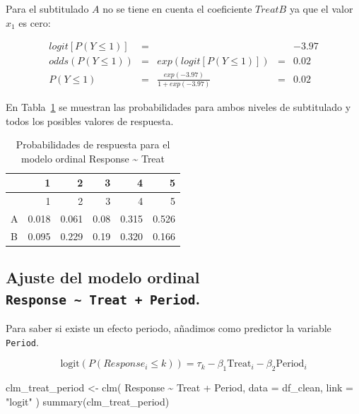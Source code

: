\documentclass[
  12pt,
  a4paper,
  extrafontsizes,
  onecolumn,
  openright]{memoir}
\newenvironment{Shaded}{\begin{snugshade}}{\end{snugshade}}
\newcommand{\AttributeTok}[1]{\textcolor[rgb]{0.40,0.45,0.13}{#1}}
\newcommand{\FunctionTok}[1]{\textcolor[rgb]{0.28,0.35,0.67}{#1}}
\newcommand{\NormalTok}[1]{\textcolor[rgb]{0.00,0.23,0.31}{#1}}
\newcommand{\OtherTok}[1]{\textcolor[rgb]{0.00,0.23,0.31}{#1}}
\newcommand{\SpecialCharTok}[1]{\textcolor[rgb]{0.37,0.37,0.37}{#1}}
\newcommand{\StringTok}[1]{\textcolor[rgb]{0.13,0.47,0.30}{#1}}
\begin{document}
Para el subtitulado \(A\) no se tiene en cuenta el coeficiente
\(TreatB\) ya que el valor \(x_1\) es cero:

\[
\begin{aligned}
logit [P(Y \le 1)] & = & & & -3.97\\
odds (P(Y \le 1)) & = & exp(logit [P(Y \le 1)]) & = & 0.02 \\
P(Y \le 1) & = & \frac{exp(-3.97)}{1 + exp(-3.97)} & = & 0.02
\end{aligned}
\]

En Tabla~\ref{tbl-probs-clm-treat} se muestran las probabilidades para
ambos niveles de subtitulado y todos los posibles valores de respuesta.

\hypertarget{tbl-probs-clm-treat}{}
\begin{longtable}[]{@{}lrrrrr@{}}
\caption{\label{tbl-probs-clm-treat}Probabilidades de respuesta para el
modelo ordinal Response \textasciitilde{} Treat}\tabularnewline
\toprule\noalign{}
& 1 & 2 & 3 & 4 & 5 \\
\midrule\noalign{}
\endfirsthead
\toprule\noalign{}
& 1 & 2 & 3 & 4 & 5 \\
\midrule\noalign{}
\endhead
\bottomrule\noalign{}
\endlastfoot
A & 0.018 & 0.061 & 0.08 & 0.315 & 0.526 \\
B & 0.095 & 0.229 & 0.19 & 0.320 & 0.166 \\
\end{longtable}

\hypertarget{ajuste-del-modelo-ordinal-response-treat-period.}{%
\subsection{\texorpdfstring{Ajuste del modelo ordinal
\texttt{Response\ \textasciitilde{}\ Treat\ +\ Period}.}{Ajuste del modelo ordinal Response \textasciitilde{} Treat + Period.}}\label{ajuste-del-modelo-ordinal-response-treat-period.}}

Para saber si existe un efecto periodo, añadimos como predictor la
variable \texttt{Period}.

\[
\text{logit}(P(Response_i \leq k)) = \tau_k - \beta_1 \text{Treat}_i - \beta_2 \text{Period}_i
\]

\scriptsize

\begin{Shaded}
\begin{Highlighting}[]
\NormalTok{clm\_treat\_period }\OtherTok{\textless{}{-}}
    \FunctionTok{clm}\NormalTok{(}
\NormalTok{        Response }\SpecialCharTok{\textasciitilde{}}\NormalTok{ Treat }\SpecialCharTok{+}\NormalTok{ Period,}
        \AttributeTok{data =}\NormalTok{ df\_clean, }\AttributeTok{link =} \StringTok{"logit"}
\NormalTok{    )}
\FunctionTok{summary}\NormalTok{(clm\_treat\_period)}
\end{Highlighting}
\end{Shaded}
\end{document}
